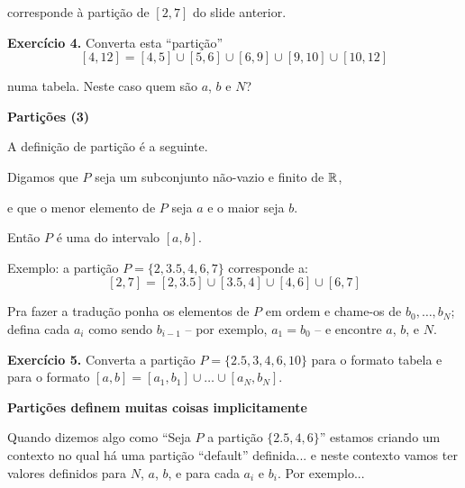 \documentclass[oneside,12pt]{article}
\begin{document}
corresponde à partição de $[2,7]$ do slide anterior.

{\bf Exercício 4.} Converta esta ``partição''
%
$$[4,12] = [4,5]∪[5,6]∪[6,9]∪[9,10]∪[10,12]$$

numa tabela. Neste caso quem são $a$, $b$ e $N$?

\newpage


{\bf Partições (3)}

A definição  de partição é a seguinte.

Digamos que $P$ seja um subconjunto não-vazio e finito de $\mathbb{R}$,

e que o menor elemento de $P$ seja $a$ e o maior seja $b$.

Então $P$ é uma  do intervalo $[a,b]$.

\msk

Exemplo: a partição $P=\{2,3.5,4,6,7\}$ corresponde a:
%
$$[2,7] = [2,3.5]∪[3.5,4]∪[4,6]∪[6,7]$$

Pra fazer a tradução ponha os elementos de $P$ em ordem e chame-os de
$b_0,\ldots,b_N$; defina cada $a_i$ como sendo $b_{i-1}$ -- por
exemplo, $a_1 = b_0$ -- e encontre $a$, $b$, e $N$.

\msk

{\bf Exercício 5.} Converta a partição $P=\{2.5,3,4,6,10\}$ para o
formato tabela e para o formato $[a,b] = [a_1,b_1]∪\ldots∪[a_N,b_N].$



\newpage


{\bf Partições definem muitas coisas implicitamente}

Quando dizemos algo como ``Seja $P$ a partição $\{2.5,4,6\}$'' estamos
criando um contexto no qual há uma partição ``default'' definida... e
neste contexto vamos ter valores definidos para $N$, $a$, $b$, e para
cada $a_i$ e $b_i$. Por exemplo...
\end{document}
